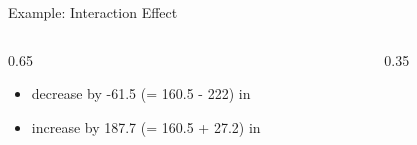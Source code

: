 \documentclass[10pt,compress,t,notes=noshow, xcolor=table]{beamer}
\begin{document}
\begin{frame}{Example: Interaction Effect}
\begin{columns}[T, totalwidth=\textwidth]
\begin{column}{0.65\linewidth}
\begin{itemize}[<+->]
    \item decrease by -61.5 (= 160.5 - 222) in 
    \item increase by 187.7 (= 160.5 + 27.2) in 
\end{itemize} %
\end{column}
\begin{column}{0.35\linewidth}
\end{column}
\end{columns}
\end{frame}
\end{document}
